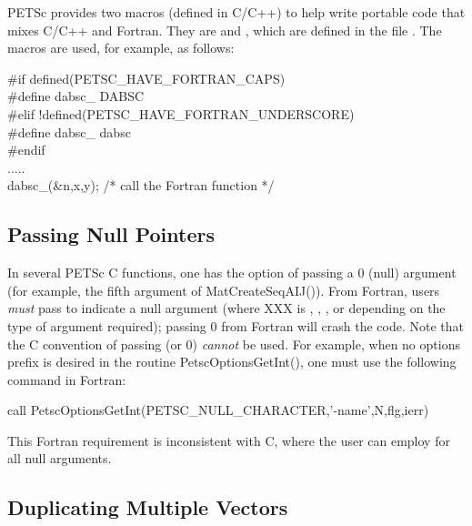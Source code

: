PETSc provides two macros (defined in C/C++) to help write 
portable code that mixes C/C++ and Fortran. They are 
 and 
 ,
which are defined in the file .
The macros are used, for example, as follows:
\begin{tabbing}
   \#if defined(PETSC\_HAVE\_FORTRAN\_CAPS)\\
   \#define dabsc\_ DABSC\\
   \#elif !defined(PETSC\_HAVE\_FORTRAN\_UNDERSCORE)\\
   \#define dabsc\_ dabsc\\
   \#endif\\
   .....\\
   dabsc\_(\&n,x,y); /* call the Fortran function */
\end{tabbing}


\subsection{Passing Null Pointers}

In several PETSc C functions, one has the option of passing a 0 (null)
argument (for example, the fifth argument of MatCreateSeqAIJ()).
From Fortran, users {\em must} pass  to indicate a
null argument (where XXX is , , ,
or  depending on the type of argument required); 
 passing  0 from 
 Fortran   will crash
the code.   Note
that the C convention of passing  (or 0) {\em cannot}
be used.  For example, when no options prefix is desired in the
routine PetscOptionsGetInt(), one must use the following command in
Fortran:
\begin{tabbing}
    call PetscOptionsGetInt(PETSC\_NULL\_CHARACTER,'-name',N,flg,ierr)
\end{tabbing}

This Fortran requirement is inconsistent with C, where the 
user can employ  for all null arguments. 

\subsection{Duplicating Multiple Vectors}
\label{sec_fortvecd}


